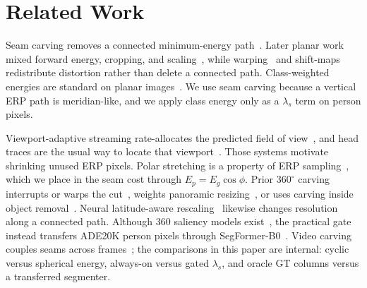 \section{Related Work}
\label{sec:related}

Seam carving removes a connected minimum-energy
path~\cite{avidan2007seam}. Later planar work mixed forward energy,
cropping, and scaling~\cite{rubinstein2008improved,rubinstein2009multi},
while warping~\cite{wolf2007nonhomogeneous,wang2008scale} and
shift-maps~\cite{pritch2009shiftmap} redistribute distortion
rather than delete a connected path. Class-weighted energies are
standard on planar
images~\cite{itti1998saliency,goferman2010context}. We use seam
carving because a vertical ERP path is meridian-like, and we
apply class energy only as a $\lambda_s$ term on person pixels.

Viewport-adaptive streaming rate-allocates the predicted field of
view~\cite{hosseini2016adaptive,corbillon2017viewport,corbillon2017optimal,graf2017omnidirectional,qian2018flare},
and head traces are the usual way to locate that
viewport~\cite{sitzmann2018saliencyvr,david2018headeye}. Those
systems motivate shrinking unused ERP pixels. Polar stretching is
a property of ERP
sampling~\cite{coors2018spherenet,cheng2018cubepadding}, which we
place in the seam cost through $E_p=E_g\cos\phi$. Prior
$360^\circ$ carving interrupts or warps the
cut~\cite{tsubaki2018interrupted}, weights panoramic
resizing~\cite{choi2021distortion}, or uses carving inside object
removal~\cite{macquarrie2015object}. Neural latitude-aware
rescaling~\cite{guo2023dinn360} likewise changes resolution along
a connected path. Although 360 saliency models
exist~\cite{monroy2018salnet360}, the practical gate instead
transfers ADE20K person pixels through
SegFormer-B0~\cite{xie2021segformer,zhou2017ade20k}. Video carving
couples seams across frames~\cite{rubinstein2008improved}; the
comparisons in this paper are internal: cyclic versus spherical
energy, always-on versus gated $\lambda_s$, and oracle GT columns
versus a transferred segmenter.
